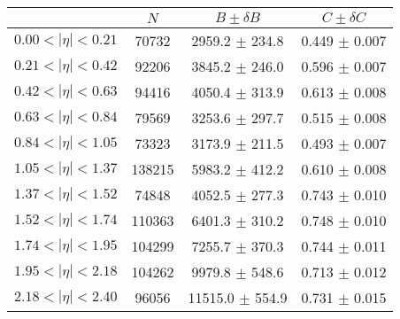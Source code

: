 \begin{tabular}{lccc}
\hline
    &   $N$   & $B \pm \delta B$  &  $C \pm \delta C$ \\
\hline
$0.00 < |\eta| <0.21$          & 70732      & 2959.2     $\pm$ 234.8 & 0.449      $\pm$ 0.007 \\
$0.21 < |\eta| <0.42$          & 92206      & 3845.2     $\pm$ 246.0 & 0.596      $\pm$ 0.007 \\
$0.42 < |\eta| <0.63$          & 94416      & 4050.4     $\pm$ 313.9 & 0.613      $\pm$ 0.008 \\
$0.63 < |\eta| <0.84$          & 79569      & 3253.6     $\pm$ 297.7 & 0.515      $\pm$ 0.008 \\
$0.84 < |\eta| <1.05$          & 73323      & 3173.9     $\pm$ 211.5 & 0.493      $\pm$ 0.007 \\
$1.05 < |\eta| <1.37$          & 138215     & 5983.2     $\pm$ 412.2 & 0.610      $\pm$ 0.008 \\
$1.37 < |\eta| <1.52$          & 74848      & 4052.5     $\pm$ 277.3 & 0.743      $\pm$ 0.010 \\
$1.52 < |\eta| <1.74$          & 110363     & 6401.3     $\pm$ 310.2 & 0.748      $\pm$ 0.010 \\
$1.74 < |\eta| <1.95$          & 104299     & 7255.7     $\pm$ 370.3 & 0.744      $\pm$ 0.011 \\
$1.95 < |\eta| <2.18$          & 104262     & 9979.8     $\pm$ 548.6 & 0.713      $\pm$ 0.012 \\
$2.18 < |\eta| <2.40$          & 96056      & 11515.0    $\pm$ 554.9 & 0.731      $\pm$ 0.015 \\
\hline
\end{tabular}
